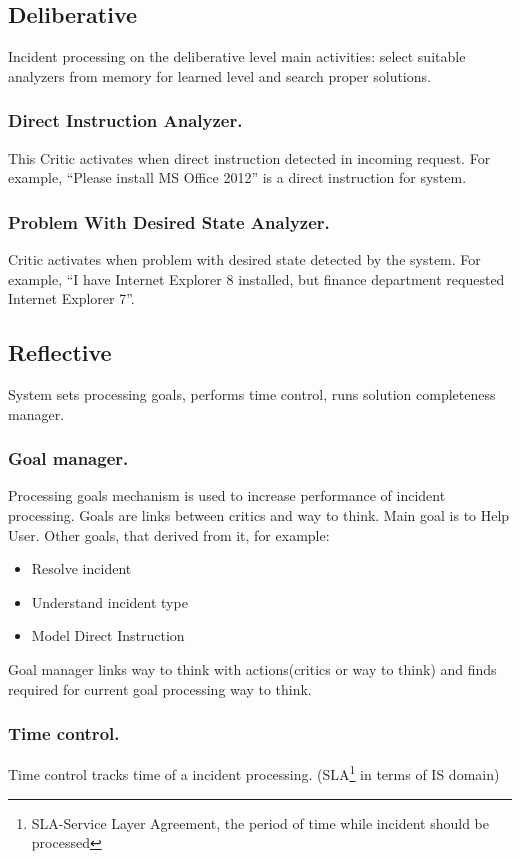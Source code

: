 \documentclass[runningheads,a4paper]{llncs}
\begin{document}
\subsection{Deliberative}

Incident processing on the deliberative level main activities: select suitable analyzers from memory for learned level and search proper solutions.

\subsubsection{Direct Instruction Analyzer.} This Critic activates when direct instruction detected in incoming request. For example, “Please install MS Office 2012” is a direct instruction for system.
\subsubsection{Problem With Desired State Analyzer.} Critic activates when problem with desired state detected by the system. For example, “I have Internet Explorer 8 installed, but finance department requested Internet Explorer 7”.

\subsection{Reflective}

System sets processing goals, performs time control, runs solution completeness manager.

\subsubsection{Goal manager.} Processing goals mechanism is used to increase performance of incident processing. Goals are links between critics and way to think. Main goal is to Help User. Other goals, that derived from it, for example:
\begin{itemize}
 \item Resolve incident
 \item Understand incident type
 \item Model Direct Instruction
\end{itemize}
Goal manager links way to think with actions(critics or way to think) and finds required for current goal processing way to think.

\subsubsection{Time control.} Time control tracks time of a incident processing. (SLA\footnote{SLA-Service Layer Agreement, the period of time while incident should be processed} in terms of IS domain)
\end{document}
